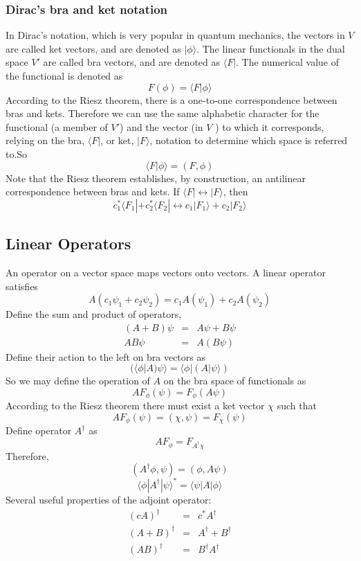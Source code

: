 \documentclass{article}
\begin{document}
\subsubsection{Dirac's bra and ket notation}
In Dirac’s notation, which is very popular in quantum mechanics, the
vectors in $V$ are called ket vectors, and are denoted as $|\phi \rangle$. The linear functionals in the dual space $V'$ are called bra vectors, and are denoted as $\langle F |$. The numerical value of the functional is denoted as
\[F(\phi) = \langle F | \phi \rangle\]
According to the Riesz theorem, there is a one-to-one correspondence between bras and kets. Therefore we can use the same alphabetic character for the functional (a member of $V'$) and the vector (in $V$ ) to which it corresponds, relying on the bra, $\langle F |$, or ket, $|F\rangle$, notation to determine which space is
referred to.So
\[\langle F | \phi \rangle = (F,\phi)\]
Note that the Riesz theorem establishes, by construction, an antilinear correspondence between bras and kets. If $\langle F | \leftrightarrow  |F\rangle$, then
\[c_1^* \langle F_1 | + c_2^* \langle F_2 | \leftrightarrow  c_1 |F_1\rangle + c_2|F_2\rangle\]

\subsection{Linear Operators}
An operator on a vector space maps vectors onto vectors.
A linear operator satisfies
\[A (c_1 \psi_1 + c_2 \psi_2) = c_1 A(\psi_1) + c_2 A(\psi_2)\]
Define the sum and product of operators,
\begin{eqnarray}
(A+B)\psi &=& A\psi + B\psi \nonumber \\
A B \psi &=& A (B\psi) \nonumber
\end{eqnarray}
Define their action to the left on bra vectors as
\[(\langle \phi | A ) \psi \rangle = \langle \phi | ( A | \psi \rangle )\]
So we may define the operation of $A$ on the bra space of functionals as
\[A F_{\phi} (\psi) = F_{\phi}(A\psi)\]
According to the Riesz theorem there must exist a ket vector $\chi$ such that
\[AF_{\phi}(\psi) = (\chi, \psi) = F_{\chi}(\psi)\]
Define operator $A^{\dagger}$ as
\[AF_{\phi} = F_{A^{\dagger}\chi}\]
Therefore,
\[(A^{\dagger}\phi, \psi) = (\phi, A\psi)\]
\[\langle \phi | A^{\dagger} | \psi \rangle ^* = \langle \psi | A | \phi \rangle\]
Several useful properties of the adjoint operator:
\begin{eqnarray}
(cA)^{\dagger} &=& c^* A^{\dagger} \nonumber \\
(A + B)^{\dagger} &=& A^{\dagger} + B^{\dagger} \nonumber \\
(AB)^{\dagger} &=& B^{\dagger}  A^{\dagger} \nonumber
\end{eqnarray}
\end{document}
